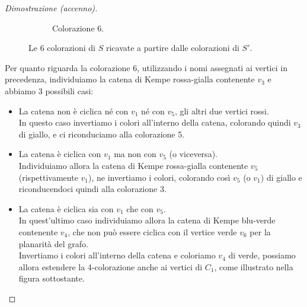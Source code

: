 \documentclass[a4paper,12pt,titlepage]{report}
\begin{document}
\begin{proof}[Dimostrazione (accenno)]
\begin{figure}[H]
\begin{subfigure}{0.3\textwidth}
    			\caption{Colorazione 6.}
    		\end{subfigure}
    		\caption{Le 6 colorazioni di $S$ ricavate a partire dalle colorazioni di $S'$.}
    		\end{figure}
    		Per quanto riguarda la colorazione 6, utilizzando i nomi assegnati ai vertici in precedenza, individuiamo la catena di Kempe rossa-gialla contenente $v_3$ e abbiamo 3 possibili casi:
    		\begin{itemize}
    			\item La catena non è ciclica né con $v_1$ né con $v_5$, gli altri due vertici rossi.
    			\\In questo caso invertiamo i colori all'interno della catena, colorando quindi $v_3$ di giallo, e ci riconduciamo alla colorazione 5.
    			\item La catena è ciclica con $v_1$ ma non con $v_5$ (o viceversa).
    			\\Individuiamo allora la catena di Kempe rossa-gialla contenente $v_5$ (rispettivamente $v_1$), ne invertiamo i colori, colorando così $v_5$ (o $v_1$) di giallo e riconducendoci quindi alla colorazione 3.
    			\item La catena è ciclica sia con $v_1$ che con $v_5$.
    			\\In quest'ultimo caso individuiamo allora la catena di Kempe blu-verde contenente $v_4$, che non può essere ciclica con il vertice verde $v_6$ per la planarità del grafo.
    			\\Invertiamo i colori all'interno della catena e coloriamo $v_4$ di verde, possiamo allora estendere la 4-colorazione anche ai vertici di $C_1$, come illustrato nella figura sottostante.
    		\end{itemize}
    		\begin{figure}[H]
    			\centering
\end{figure}
\end{proof}
\end{document}

